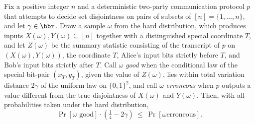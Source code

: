 \begin{theorem}
\label{CommunicationComplexity.Functions.Disjointness.RandomizedLowerBound.goodZEvent_mul_quarter_sub_two_mul_le_protocolErrorEvent}
\leanok
{}
Fix a positive integer $n$ and a deterministic two-party communication protocol $p$ that
attempts to decide set disjointness on pairs of subsets of $[n]=\{1,\dots,n\}$, and let
$\gamma\in\bbr$. Draw a sample $\omega$ from the hard distribution, which produces
inputs $X(\omega),Y(\omega)\subseteq[n]$ together with a distinguished special
coordinate $T$, and let $Z(\omega)$ be the summary statistic consisting of the
transcript of $p$ on $(X(\omega),Y(\omega))$, the coordinate $T$, Alice's input bits
strictly before $T$, and Bob's input bits strictly after $T$. Call $\omega$ \emph{good}
when the conditional law of the special bit-pair $(x_T,y_T)$, given the value of
$Z(\omega)$, lies within total variation distance $2\gamma$ of the uniform law on
$\{0,1\}^2$, and call $\omega$ \emph{erroneous} when $p$ outputs a value different from
the true disjointness of $X(\omega)$ and $Y(\omega)$. Then, with all probabilities taken
under the hard distribution,
\[
\Pr[\omega \text{ good}]\cdot\left(\tfrac14 - 2\gamma\right)\ \le\ \Pr[\omega \text{
erroneous}].
\]
\end{theorem}

